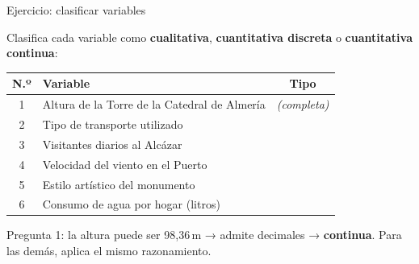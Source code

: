 \documentclass[aspectratio=169, 10pt, spanish]{beamer}
\begin{document}
\begin{frame}{Ejercicio: clasificar variables}
  \begin{recordarbox}
    Clasifica cada variable como \textbf{cualitativa},
    \textbf{cuantitativa discreta} o \textbf{cuantitativa continua}:

    \vspace{0.25cm}
    \renewcommand{\arraystretch}{1.3}
    \begin{tabular}{clc}
      \toprule
      \textbf{N.º} & \textbf{Variable} & \textbf{Tipo} \\
      \midrule
      1 & Altura de la Torre de la Catedral de Almería & \textcolor{AlmGris}{\textit{(completa)}} \\
      2 & Tipo de transporte utilizado & \\
      3 & Visitantes diarios al Alcázar & \\
      4 & Velocidad del viento en el Puerto & \\
      5 & Estilo artístico del monumento & \\
      6 & Consumo de agua por hogar (litros) & \\
      \bottomrule
    \end{tabular}
  \end{recordarbox}

  \begin{notabox}[Pista]
    \AlmFontSmall
    Pregunta 1: la altura puede ser 98{,}36\,m → admite decimales → \textbf{continua}.
    Para las demás, aplica el mismo razonamiento.
  \end{notabox}
\end{frame}
\end{document}
